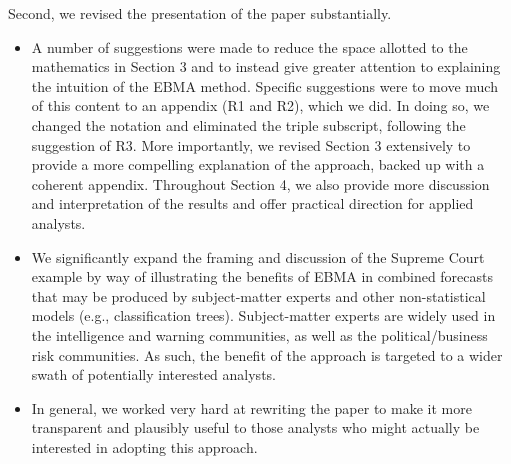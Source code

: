\documentclass[10pt]{article}
\begin{document}
Second, we revised the presentation of the paper substantially.
\begin{itemize}
\item A number of suggestions were made to reduce the space allotted to the mathematics in Section 3 and to instead give greater attention to explaining the intuition of the EBMA method.  Specific suggestions were to move much of this content to an appendix (R1 and R2), which we did. In doing so, we changed the notation and eliminated the triple subscript, following the suggestion of R3.  More importantly, we revised Section 3 extensively to provide a more compelling explanation of the approach, backed up with a coherent appendix.  Throughout Section 4, we also provide more discussion and interpretation of the results and offer practical direction for applied analysts.

\item We significantly expand the framing and discussion of the Supreme Court example by way of illustrating the benefits of EBMA in combined forecasts that may be produced by subject-matter experts and other non-statistical models (e.g., classification trees).  Subject-matter experts are widely used in the intelligence and warning communities, as well as the political/business risk communities. As such, the benefit of the approach is targeted to a wider swath of potentially interested analysts.  

\item In general, we worked very hard at rewriting the paper to make it more transparent and plausibly useful to those analysts who might actually be interested in adopting this approach.

\end{itemize}
\end{document}
